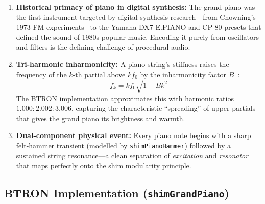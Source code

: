 \documentclass[10pt,journal,compsoc,twocolumn]{article}
\begin{document}
\begin{enumerate}[leftmargin=*]
    \item \textbf{Historical primacy of piano in digital synthesis:}  The
    grand piano was the first instrument targeted by digital synthesis
    research---from Chowning's 1973 FM experiments~\cite{chowning1973synthesis}
    to the Yamaha DX7 E.PIANO and CP-80 presets that defined the sound of 1980s
    popular music.  Encoding it purely from oscillators and filters is the
    defining challenge of procedural audio.

    \item \textbf{Tri-harmonic inharmonicity:}  A piano string's stiffness
    raises the frequency of the $k$-th partial above $kf_0$ by the
    inharmonicity factor $B$~\cite{fletcher1998physics}:
    \begin{equation}
    f_k = k f_0 \sqrt{1 + Bk^2}
    \label{eq:piano_inharmonicity}
    \end{equation}
    The BTRON implementation approximates this with harmonic ratios
    $1.000 : 2.002 : 3.006$, capturing the characteristic ``spreading'' of
    upper partials that gives the grand piano its brightness and warmth.

    \item \textbf{Dual-component physical event:}  Every piano note begins
    with a sharp felt-hammer transient (modelled by
    \texttt{shimPianoHammer}) followed by a sustained string resonance---a
    clean separation of \emph{excitation} and \emph{resonator} that maps
    perfectly onto the shim modularity principle.
\end{enumerate}

\subsection{BTRON Implementation (\texttt{shimGrandPiano})}
\end{document}
